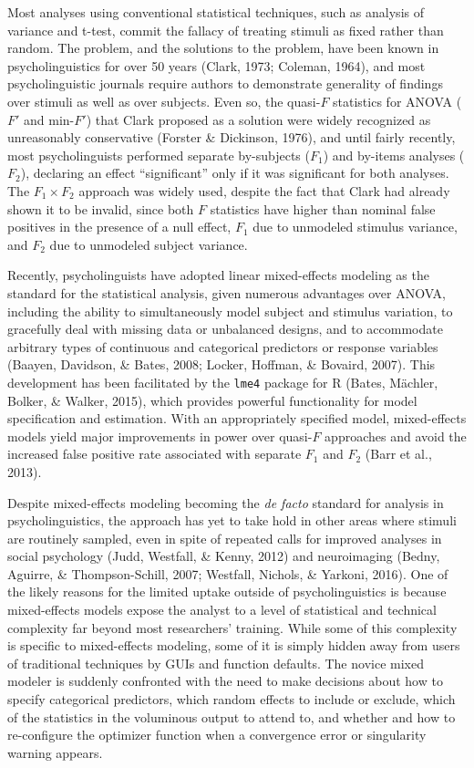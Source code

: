 \documentclass[man,floatsintext]{apa6}
\begin{document}
Most analyses using conventional statistical techniques, such as analysis of variance and t-test, commit the fallacy of treating stimuli as fixed rather than random. The problem, and the solutions to the problem, have been known in psycholinguistics for over 50 years (Clark, 1973; Coleman, 1964), and most psycholinguistic journals require authors to demonstrate generality of findings over stimuli as well as over subjects. Even so, the quasi-\(F\) statistics for ANOVA (\(F'\) and min-\(F'\)) that Clark proposed as a solution were widely recognized as unreasonably conservative (Forster \& Dickinson, 1976), and until fairly recently, most psycholinguists performed separate by-subjects (\(F_1\)) and by-items analyses (\(F_2\)), declaring an effect \enquote{significant} only if it was significant for both analyses. The \(F_1 \times F_2\) approach was widely used, despite the fact that Clark had already shown it to be invalid, since both \(F\) statistics have higher than nominal false positives in the presence of a null effect, \(F_1\) due to unmodeled stimulus variance, and \(F_2\) due to unmodeled subject variance.

Recently, psycholinguists have adopted linear mixed-effects modeling as the standard for the statistical analysis, given numerous advantages over ANOVA, including the ability to simultaneously model subject and stimulus variation, to gracefully deal with missing data or unbalanced designs, and to accommodate arbitrary types of continuous and categorical predictors or response variables (Baayen, Davidson, \& Bates, 2008; Locker, Hoffman, \& Bovaird, 2007). This development has been facilitated by the \texttt{lme4} package for R (Bates, Mächler, Bolker, \& Walker, 2015), which provides powerful functionality for model specification and estimation. With an appropriately specified model, mixed-effects models yield major improvements in power over quasi-\(F\) approaches and avoid the increased false positive rate associated with separate \(F_1\) and \(F_2\) (Barr et al., 2013).

Despite mixed-effects modeling becoming the \emph{de facto} standard for analysis in psycholinguistics, the approach has yet to take hold in other areas where stimuli are routinely sampled, even in spite of repeated calls for improved analyses in social psychology (Judd, Westfall, \& Kenny, 2012) and neuroimaging (Bedny, Aguirre, \& Thompson-Schill, 2007; Westfall, Nichols, \& Yarkoni, 2016). One of the likely reasons for the limited uptake outside of psycholinguistics is because mixed-effects models expose the analyst to a level of statistical and technical complexity far beyond most researchers' training. While some of this complexity is specific to mixed-effects modeling, some of it is simply hidden away from users of traditional techniques by GUIs and function defaults. The novice mixed modeler is suddenly confronted with the need to make decisions about how to specify categorical predictors, which random effects to include or exclude, which of the statistics in the voluminous output to attend to, and whether and how to re-configure the optimizer function when a convergence error or singularity warning appears.
\end{document}
